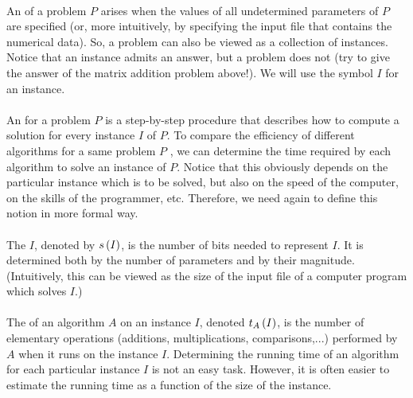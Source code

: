 \paragraph{}
An  of a problem $P$ arises when the values of all undetermined parameters of $P$ are specified (or, more intuitively, by specifying the input file that contains the numerical data). So, a problem can also be viewed as a collection of instances. Notice that an instance admits an answer, but a problem does not (try to give the answer of the matrix addition problem above!). We will use the symbol $I$ for an instance.

\paragraph{}
An  for a problem $P$ is a step-by-step procedure that describes how to compute a solution for every instance $I$ of $P$. To compare the efficiency of different algorithms for a same problem $P$ , we can determine the time required by each algorithm to solve an instance of $P$. Notice that this obviously depends on the particular instance which is to be solved, but also on the speed of the computer, on the skills of the programmer, etc. Therefore, we need again to define this notion in more formal way.

\paragraph{}
The  $I$, denoted by $s\left( I \right)$, is the number of bits needed to represent $I$. It is determined both by the number of parameters and by their magnitude. (Intuitively, this can be viewed as the size of the input file of a computer program which solves $I$.)

\paragraph{}
The  of an algorithm $A$ on an instance $I$, denoted $t_A\left( I \right)$, is the number of elementary operations (additions, multiplications, comparisons,...) performed by $A$ when it runs on the instance $I$. Determining the running time of an algorithm for each particular instance $I$ is not an easy task. However, it is often easier to estimate the running time as a function of the size of the instance.

